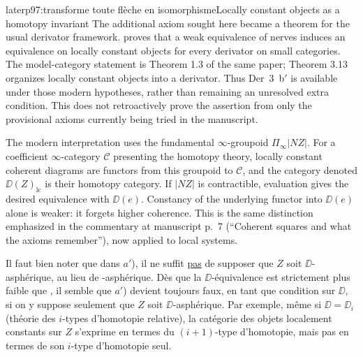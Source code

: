 \begin{dcomment}{later}{p97:transforme toute flèche en isomorphisme}{Locally constant objects as a homotopy invariant}
The additional axiom sought here became a theorem for the usual derivator framework. \citet[Corollary 3.8]{Cisinski2009LocallyConstant} proves that a weak equivalence of nerves induces an equivalence on locally constant objects for every derivator on small categories. The model-category statement is Theorem 1.3 of the same paper; Theorem 3.13 organizes locally constant objects into a derivator. Thus Der~3~b$'$ is available under those modern hypotheses, rather than remaining an unresolved extra condition. This does not retroactively prove the assertion from only the provisional axioms currently being tried in the manuscript.

The modern interpretation uses the fundamental $\infty$-groupoid $\Pi_\infty|NZ|$. For a coefficient $\infty$-category $\mathcal C$ presenting the homotopy theory, locally constant coherent diagrams are functors from this groupoid to $\mathcal C$, and the category denoted $\DD(Z)_{\mathrm{lc}}$ is their homotopy category. If $|NZ|$ is contractible, evaluation gives the desired equivalence with $\DD(e)$. Constancy of the underlying functor into $\DD(e)$ alone is weaker: it forgets higher coherence. This is the same distinction emphasized in the commentary at manuscript p.~7 (``Coherent squares and what the axioms remember''), now applied to local systems.
\end{dcomment}


Il faut bien noter que dans $a'$), il ne suffit \underline{pas} de supposer que $Z$ soit $\DD$-asphérique, au lieu de \Hot-asphérique. Dès que la $\DD$-équivalence est strictement plus faible que \Hot, il semble que $a'$) devient toujours faux, en tant que condition sur $\DD$, si on y suppose seulement que $Z$ soit $\DD$-asphérique. Par exemple, même si $\DD = \DD_i$ (théorie des $i$-types d’homotopie relative), la catégorie
des objets localement constants sur $Z$ s’exprime en termes du $(i+1)$-type d’homotopie, mais pas en termes de son $i$-type d’homotopie seul.

